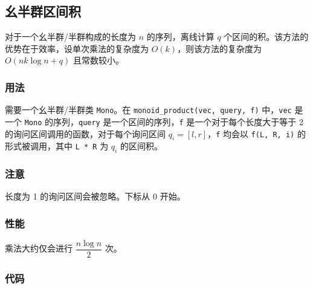 \subsection{幺半群区间积}

对于一个幺半群/半群构成的长度为 $n$ 的序列，离线计算 $q$ 个区间的积。该方法的优势在于效率，设单次乘法的复杂度为 $O(k)$，则该方法的复杂度为 $O(nk\log n + q)$ 且常数较小。

\subsubsection{用法}

需要一个幺半群/半群类 \lstinline{Mono}。在 \lstinline{monoid_product(vec, query, f)} 中，\lstinline{vec} 是一个 \lstinline{Mono} 的序列，\lstinline{query} 是一个区间的序列，\lstinline{f} 是一个对于每个长度大于等于 2 的询问区间调用的函数，对于每个询问区间 $q_i = [l, r]$，\lstinline{f} 均会以 \lstinline{f(L, R, i)} 的形式被调用，其中 \lstinline{L * R} 为 $q_i$ 的区间积。

\subsubsection{注意}

长度为 1 的询问区间会被忽略。下标从 0 开始。

\subsubsection{性能}

乘法大约仅会进行 $\dfrac{n \log n}{2}$ 次。

\subsubsection{代码}


